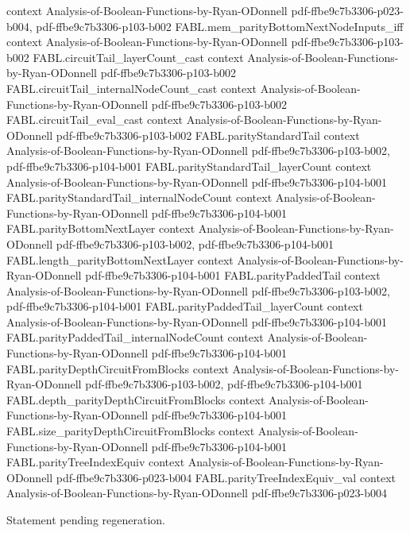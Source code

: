 \begin{theorem}
  {context}
  {Analysis-of-Boolean-Functions-by-Ryan-ODonnell}
  {pdf-ffbe9c7b3306-p023-b004,
    pdf-ffbe9c7b3306-p103-b002}
\proofstep
  {FABL.mem_parityBottomNextNodeInputs_iff}
  {context}
  {Analysis-of-Boolean-Functions-by-Ryan-ODonnell}
  {pdf-ffbe9c7b3306-p103-b002}
\proofstep
  {FABL.circuitTail_layerCount_cast}
  {context}
  {Analysis-of-Boolean-Functions-by-Ryan-ODonnell}
  {pdf-ffbe9c7b3306-p103-b002}
\proofstep
  {FABL.circuitTail_internalNodeCount_cast}
  {context}
  {Analysis-of-Boolean-Functions-by-Ryan-ODonnell}
  {pdf-ffbe9c7b3306-p103-b002}
\proofstep
  {FABL.circuitTail_eval_cast}
  {context}
  {Analysis-of-Boolean-Functions-by-Ryan-ODonnell}
  {pdf-ffbe9c7b3306-p103-b002}
\proofstep
  {FABL.parityStandardTail}
  {context}
  {Analysis-of-Boolean-Functions-by-Ryan-ODonnell}
  {pdf-ffbe9c7b3306-p103-b002,
    pdf-ffbe9c7b3306-p104-b001}
\proofstep
  {FABL.parityStandardTail_layerCount}
  {context}
  {Analysis-of-Boolean-Functions-by-Ryan-ODonnell}
  {pdf-ffbe9c7b3306-p104-b001}
\proofstep
  {FABL.parityStandardTail_internalNodeCount}
  {context}
  {Analysis-of-Boolean-Functions-by-Ryan-ODonnell}
  {pdf-ffbe9c7b3306-p104-b001}
\proofstep
  {FABL.parityBottomNextLayer}
  {context}
  {Analysis-of-Boolean-Functions-by-Ryan-ODonnell}
  {pdf-ffbe9c7b3306-p103-b002,
    pdf-ffbe9c7b3306-p104-b001}
\proofstep
  {FABL.length_parityBottomNextLayer}
  {context}
  {Analysis-of-Boolean-Functions-by-Ryan-ODonnell}
  {pdf-ffbe9c7b3306-p104-b001}
\proofstep
  {FABL.parityPaddedTail}
  {context}
  {Analysis-of-Boolean-Functions-by-Ryan-ODonnell}
  {pdf-ffbe9c7b3306-p103-b002,
    pdf-ffbe9c7b3306-p104-b001}
\proofstep
  {FABL.parityPaddedTail_layerCount}
  {context}
  {Analysis-of-Boolean-Functions-by-Ryan-ODonnell}
  {pdf-ffbe9c7b3306-p104-b001}
\proofstep
  {FABL.parityPaddedTail_internalNodeCount}
  {context}
  {Analysis-of-Boolean-Functions-by-Ryan-ODonnell}
  {pdf-ffbe9c7b3306-p104-b001}
\proofstep
  {FABL.parityDepthCircuitFromBlocks}
  {context}
  {Analysis-of-Boolean-Functions-by-Ryan-ODonnell}
  {pdf-ffbe9c7b3306-p103-b002,
    pdf-ffbe9c7b3306-p104-b001}
\proofstep
  {FABL.depth_parityDepthCircuitFromBlocks}
  {context}
  {Analysis-of-Boolean-Functions-by-Ryan-ODonnell}
  {pdf-ffbe9c7b3306-p104-b001}
\proofstep
  {FABL.size_parityDepthCircuitFromBlocks}
  {context}
  {Analysis-of-Boolean-Functions-by-Ryan-ODonnell}
  {pdf-ffbe9c7b3306-p104-b001}
\proofstep
  {FABL.parityTreeIndexEquiv}
  {context}
  {Analysis-of-Boolean-Functions-by-Ryan-ODonnell}
  {pdf-ffbe9c7b3306-p023-b004}
\proofstep
  {FABL.parityTreeIndexEquiv_val}
  {context}
  {Analysis-of-Boolean-Functions-by-Ryan-ODonnell}
  {pdf-ffbe9c7b3306-p023-b004}

Statement pending regeneration.
\end{theorem}

